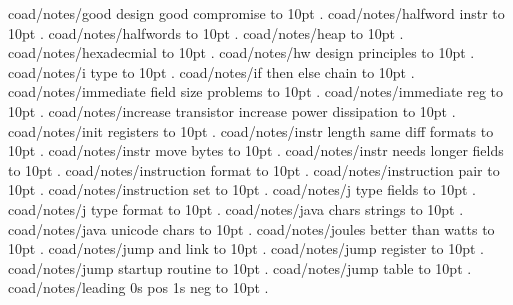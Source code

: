 \smallskip
coad/notes/good design good compromise \leaders\hbox to 10pt {\hss.\hss}  \hfill {}
\smallskip
coad/notes/halfword instr \leaders\hbox to 10pt {\hss.\hss}  \hfill {}
\smallskip
coad/notes/halfwords \leaders\hbox to 10pt {\hss.\hss}  \hfill {}
\smallskip
coad/notes/heap \leaders\hbox to 10pt {\hss.\hss}  \hfill {}
\smallskip
coad/notes/hexadecmial \leaders\hbox to 10pt {\hss.\hss}  \hfill {}
\smallskip
coad/notes/hw design principles \leaders\hbox to 10pt {\hss.\hss}  \hfill {}
\smallskip
coad/notes/i type \leaders\hbox to 10pt {\hss.\hss}  \hfill {}
\smallskip
coad/notes/if then else chain \leaders\hbox to 10pt {\hss.\hss}  \hfill {}
\smallskip
coad/notes/immediate field size problems \leaders\hbox to 10pt {\hss.\hss}  \hfill {}
\smallskip
coad/notes/immediate reg \leaders\hbox to 10pt {\hss.\hss}  \hfill {}
\smallskip
coad/notes/increase transistor increase power dissipation \leaders\hbox to 10pt {\hss.\hss}  \hfill {}
\smallskip
coad/notes/init registers \leaders\hbox to 10pt {\hss.\hss}  \hfill {}
\smallskip
coad/notes/instr length same diff formats \leaders\hbox to 10pt {\hss.\hss}  \hfill {}
\smallskip
coad/notes/instr move bytes \leaders\hbox to 10pt {\hss.\hss}  \hfill {}
\smallskip
coad/notes/instr needs longer fields \leaders\hbox to 10pt {\hss.\hss}  \hfill {}
\smallskip
coad/notes/instruction format \leaders\hbox to 10pt {\hss.\hss}  \hfill {}
\smallskip
coad/notes/instruction pair \leaders\hbox to 10pt {\hss.\hss}  \hfill {}
\smallskip
coad/notes/instruction set \leaders\hbox to 10pt {\hss.\hss}  \hfill {}
\smallskip
coad/notes/j type fields \leaders\hbox to 10pt {\hss.\hss}  \hfill {}
\smallskip
coad/notes/j type format \leaders\hbox to 10pt {\hss.\hss}  \hfill {}
\smallskip
coad/notes/java chars strings \leaders\hbox to 10pt {\hss.\hss}  \hfill {}
\smallskip
coad/notes/java unicode chars \leaders\hbox to 10pt {\hss.\hss}  \hfill {}
\smallskip
coad/notes/joules better than watts \leaders\hbox to 10pt {\hss.\hss}  \hfill {}
\smallskip
coad/notes/jump and link \leaders\hbox to 10pt {\hss.\hss}  \hfill {}
\smallskip
coad/notes/jump register \leaders\hbox to 10pt {\hss.\hss}  \hfill {}
\smallskip
coad/notes/jump startup routine \leaders\hbox to 10pt {\hss.\hss}  \hfill {}
\smallskip
coad/notes/jump table \leaders\hbox to 10pt {\hss.\hss}  \hfill {}
\smallskip
coad/notes/leading 0s pos 1s neg \leaders\hbox to 10pt {\hss.\hss}  \hfill {}
